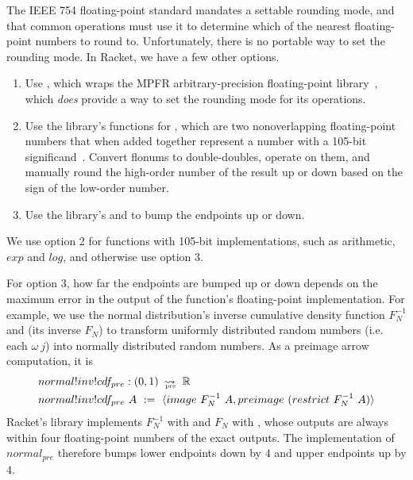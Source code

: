 The IEEE 754 floating-point standard mandates a settable rounding mode, and that common operations must use it to determine which of the nearest floating-point numbers to round to.
Unfortunately, there is no portable way to set the rounding mode.
In Racket, we have a few other options.
\begin{enumerate}
	\item Use , which wraps the MPFR arbitrary-precision floating-point library~\cite{cit:fousse-2007-mpfr}, which \emph{does} provide a way to set the rounding mode for its operations.
	\item Use the  library's functions for , which are two nonoverlapping floating-point numbers that when added together represent a number with a 105-bit significand~\cite{cit:shewchuk-1997}.
	Convert flonums to double-doubles, operate on them, and manually round the high-order number of the result up or down based on the sign of the low-order number.
	\item Use the  library's  and  to bump the endpoints up or down.
\end{enumerate}
We use option 2 for functions with 105-bit implementations, such as arithmetic, $exp$ and $log$, and otherwise use option 3.

For option 3, how far the endpoints are bumped up or down depends on the maximum error in the output of the function's floating-point implementation.
For example, we use the normal distribution's inverse cumulative density function $F_N^{-1}$ and (its inverse $F_N$) to transform uniformly distributed random numbers (i.e. each $\omega~j$) into normally distributed random numbers.
As a preimage arrow computation, it is
\begin{equation}
\begin{aligned}
	&normal!inv!cdf_{pre} : (0,1)~\operatorname{\rightsquigarrow_{\mspace{-20mu}_\mathrm{pre}}}~\mathbb{R} \\
	&normal!inv!cdf_{pre}~A\ :=\ \langle{image~F_N^{-1}~A, preimage~(restrict~F_N^{-1}~A)}\rangle
\end{aligned}
\label{eqn:normal-inv-cdf-pre}
\end{equation}
Racket's  library implements $F_N^{-1}$ with  and $F_N$ with , whose outputs are always within four floating-point numbers of the exact outputs.
The implementation of $normal_{pre}$ therefore bumps lower endpoints down by $4$ and upper endpoints up by $4$.


